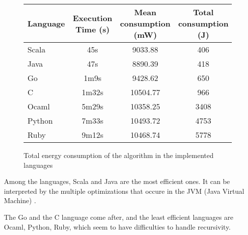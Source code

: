 \begin{figure}[H]
    \centering
    \begin{tabular}{|l|c|c|c|}
    \hline
    Language & Execution Time (s) & Mean consumption (mW) & Total consumption (J) \\
    \hline
    Scala & 45s & 9033.88 & 406\\
    Java & 47s & 8890.39 & 418\\
    Go & 1m9s & 9428.62 & 650\\
    C & 1m32s & 10504.77 & 966\\
    Ocaml & 5m29s & 10358.25 & 3408\\
    Python & 7m33s & 10493.72 & 4753\\
    Ruby & 9m12s & 10468.74 & 5778\\
    \hline
    \end{tabular}
    \caption{Total energy consumption of the algorithm in the implemented languages}
    \label{fig:tec}
    \end{figure}
    
    Among the languages, Scala and Java are the most efficient ones. It can be interpreted by the multiple optimizations that occure in the JVM (Java Virtual Machine) \cite{jvm}.
    
    The Go and the C language come after, and the least efficient languages are Ocaml, Python, Ruby, which seem to have difficulties to handle recursivity.
    
    

    


